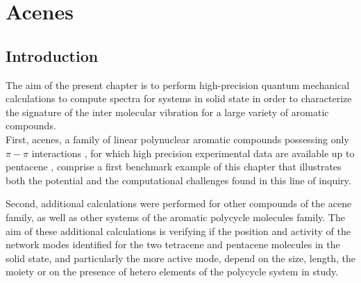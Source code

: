 \chapter[Phonon calculation]{Acenes}
\minitoc
\restoregeometry

\newpage


\section*{Introduction}

The aim of the present chapter is to perform high-precision quantum mechanical calculations to compute spectra for systems in solid state in order to characterize the signature of the inter molecular vibration for a large variety of aromatic compounds.\\

First, acenes, a family of linear polynuclear aromatic compounds possessing only $\pi-\pi$ interactions \cite{campbell1962crystal,mattheus2001polymorphism,brock1982temperature,facelli1993determination,brock1990temperature}, for which high precision experimental data are available up to pentacene \cite{michaelian2012far}, comprise a first benchmark example of this chapter that illustrates both the potential and the computational challenges found in this line of inquiry.

Second, additional calculations were performed for other compounds of the acene family, as well as other systems of the aromatic polycycle molecules family. The aim of these additional calculations is verifying if the position and activity of the network modes identified for the two tetracene and pentacene molecules in the solid state, and particularly the more active mode, depend on the size, length, the moiety or on the presence of hetero elements of the polycycle system in study.\\



